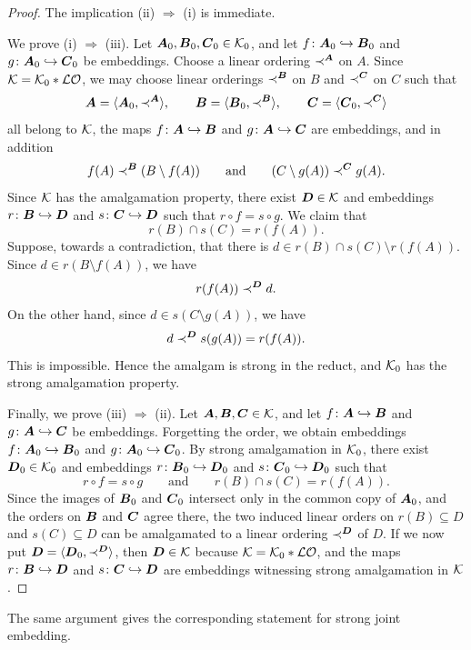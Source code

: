 \begin{proof}
    The implication (ii) \(\Rightarrow\) (i) is immediate.

    We prove (i) \(\Rightarrow\) (iii). Let \(\boldsymbol{A}_0,\boldsymbol{B}_0,\boldsymbol{C}_0\in\mathcal{K}_0\), and let \(f\colon \boldsymbol{A}_0\hookrightarrow \boldsymbol{B}_0\) and \(g\colon \boldsymbol{A}_0\hookrightarrow \boldsymbol{C}_0\) be embeddings. Choose a linear ordering \(\prec^{\boldsymbol{A}}\) on \(A\). Since \(\mathcal{K}=\mathcal{K}_0 * \mathcal{LO}\),
    we may choose linear orderings \(\prec^{\boldsymbol{B}}\) on \(B\) and \(\prec^{\boldsymbol{C}}\) on \(C\) such that
    \[
        \boldsymbol{A}=\langle \boldsymbol{A}_0,\prec^{\boldsymbol{A}}\rangle,\qquad
        \boldsymbol{B}=\langle \boldsymbol{B}_0,\prec^{\boldsymbol{B}}\rangle,\qquad
        \boldsymbol{C}=\langle \boldsymbol{C}_0,\prec^{\boldsymbol{C}}\rangle
    \]
    all belong to \(\mathcal{K}\), the maps \(f\colon \boldsymbol{A}\hookrightarrow \boldsymbol{B}\) and \(g\colon \boldsymbol{A}\hookrightarrow \boldsymbol{C}\) are embeddings, and in addition
    \[
        f(A)\prec^{\boldsymbol{B}} (B\setminus f(A))
        \qquad\text{and}\qquad
        (C\setminus g(A))\prec^{\boldsymbol{C}} g(A).
    \]
    Since \(\mathcal{K}\) has the amalgamation property, there exist \(\boldsymbol{D}\in\mathcal{K}\) and embeddings \(r\colon \boldsymbol{B}\hookrightarrow \boldsymbol{D}\) and \(s\colon \boldsymbol{C}\hookrightarrow \boldsymbol{D}\) such that \(r\circ f=s\circ g\).
    We claim that
    \[
        r(B)\cap s(C)=r(f(A)).
    \]
    Suppose, towards a contradiction, that there is \(d\in r(B)\cap s(C)\setminus r(f(A))\).
    Since \(d\in r(B\setminus f(A))\), we have
    \[
        r(f(A))\prec^{\boldsymbol{D}} d.
    \]
    On the other hand, since \(d\in s(C\setminus g(A))\), we have
    \[
        d\prec^{\boldsymbol{D}} s(g(A))=r(f(A)).
    \]
    This is impossible. Hence the amalgam is strong in the reduct, and \(\mathcal{K}_0\) has the strong amalgamation property.

    Finally, we prove (iii) \(\Rightarrow\) (ii). Let \(\boldsymbol{A},\boldsymbol{B},\boldsymbol{C}\in\mathcal{K}\), and let \(f\colon \boldsymbol{A}\hookrightarrow \boldsymbol{B}\) and \(g\colon \boldsymbol{A}\hookrightarrow \boldsymbol{C}\) be embeddings. Forgetting the order, we obtain embeddings \(f\colon \boldsymbol{A}_0\hookrightarrow \boldsymbol{B}_0\) and \(g\colon \boldsymbol{A}_0\hookrightarrow \boldsymbol{C}_0\). By strong amalgamation in \(\mathcal{K}_0\), there exist \(\boldsymbol{D}_0\in\mathcal{K}_0\) and embeddings \(r\colon \boldsymbol{B}_0\hookrightarrow \boldsymbol{D}_0\) and \(s\colon \boldsymbol{C}_0\hookrightarrow \boldsymbol{D}_0\)
    such that
    \[
        r\circ f=s\circ g
        \qquad\text{and}\qquad
        r(B)\cap s(C)=r(f(A)).
    \]
    Since the images of \(\boldsymbol{B}_0\) and \(\boldsymbol{C}_0\) intersect only in the common copy of \(\boldsymbol{A}_0\), and the orders on \(\boldsymbol{B}\) and \(\boldsymbol{C}\) agree there, the two induced linear orders on \(r(B)\subseteq D\) and \(s(C)\subseteq D\) can be amalgamated to a linear ordering \(\prec^{\boldsymbol{D}}\) of \(D\). If we now put \(\boldsymbol{D}=\langle \boldsymbol{D}_0,\prec^{\boldsymbol{D}}\rangle\), then \(\boldsymbol{D}\in\mathcal{K}\) because \(\mathcal{K}=\mathcal{K}_0 * \mathcal{LO}\), and the maps \(r\colon \boldsymbol{B}\hookrightarrow \boldsymbol{D}\) and \(s\colon \boldsymbol{C}\hookrightarrow \boldsymbol{D}\) are embeddings witnessing strong amalgamation in \(\mathcal{K}\).
\end{proof}
The same argument gives the corresponding statement for strong joint embedding.

